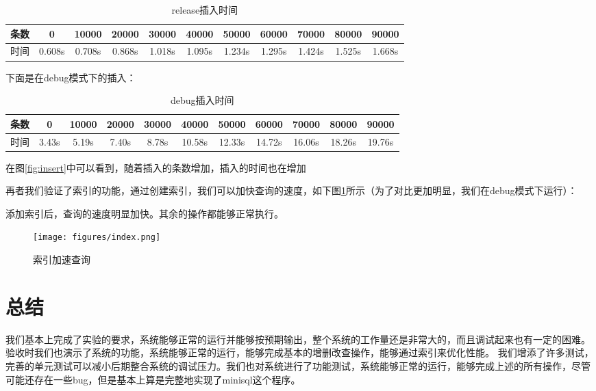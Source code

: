 \documentclass[12pt,hyperref,a4paper,UTF8]{ctexart}
\begin{document}
\begin{table}[h]
    \begin{tabular}{c|c|c|c|c|c|c|c|c|c|c}
        \hline
        条数 & 0 & 10000 & 20000 & 30000 & 40000 & 50000 & 60000 & 70000 & 80000 & 90000 \\
        \hline
        时间 & 0.608s & 0.708s & 0.868s & 1.018s & 1.095s & 1.234s &  1.295s & 1.424s & 1.525s & 1.668s \\
        \hline
    \end{tabular}
    \caption{release插入时间}
    \label{table2}
\end{table}

下面是在debug模式下的插入：

\begin{table}[h]
    \centering
    \begin{tabular}{c|c|c|c|c|c|c|c|c|c|c}
        \hline
        条数 & 0 & 10000 & 20000 & 30000 & 40000 & 50000 & 60000 & 70000 & 80000 & 90000 \\
        \hline
        时间 & 3.43s & 5.19s & 7.40s & 8.78s & 10.58s & 12.33s & 14.72s & 16.06s & 18.26s & 19.76s \\
        \hline
    \end{tabular}
    \caption{debug插入时间}
    \label{table3}
\end{table}


在图\ref{fig:insert}中可以看到，随着插入的条数增加，插入的时间也在增加

再者我们验证了索引的功能，通过创建索引，我们可以加快查询的速度，如下图\ref{fig:index}所示（为了对比更加明显，我们在debug模式下运行）：

添加索引后，查询的速度明显加快。其余的操作都能够正常执行。

\begin{figure}[ht]
    \centering
    \texttt{[image: figures/index.png]}
    \caption{索引加速查询}
    \label{fig:index}
\end{figure}

\pagebreak
\section{总结}

我们基本上完成了实验的要求，系统能够正常的运行并能够按预期输出，整个系统的工作量还是非常大的，而且调试起来也有一定的困难。验收时我们也演示了系统的功能，系统能够正常的运行，能够完成基本的增删改查操作，能够通过索引来优化性能。
我们增添了许多测试，完善的单元测试可以减小后期整合系统的调试压力。我们也对系统进行了功能测试，系统能够正常的运行，能够完成上述的所有操作，尽管可能还存在一些bug，但是基本上算是完整地实现了minisql这个程序。
\end{document}

